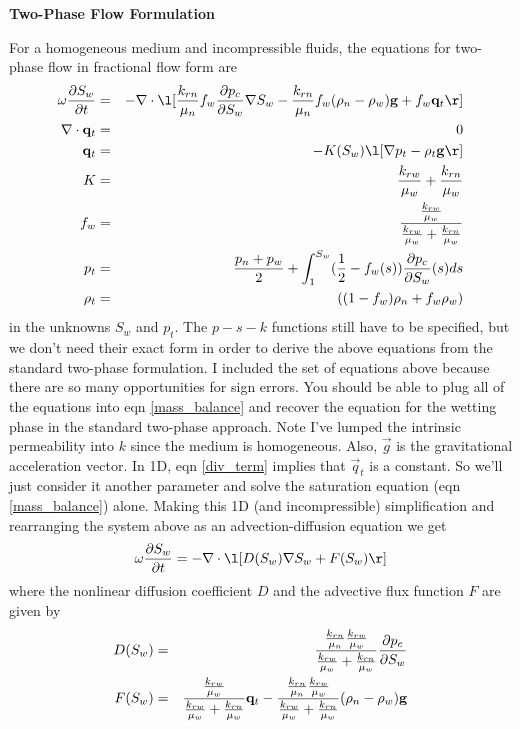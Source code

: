 \documentclass[12pt,dvips]{report}
\begin{document}
\begin{center} \bf Two-Phase Flow Formulation \end{center}

For a homogeneous medium and incompressible fluids, the equations
for two-phase flow in fractional flow form are
\begin{eqnarray}
\omega \pd{S_w}{t}  &=& - \deld \l[ \frac{k_{rn}}{\mu_n} f_w \pd{p_c}{S_w} \grad S_w - \frac{k_{rn}}{\mu_n} f_w (\rho_n - \rho_w) \vec g + f_w \vec q_t \r] \label{mass_balance}\\
\deld  \vec q_t &=& 0 \label{div_term} \\
\vec q_t &=& - K(S_w) \l[ \grad p_t  - \rho_t  \vec g \r] \\ 
K &=& \frac{k_{rw}}{\mu_w}+ \frac{k_{rn}}{\mu_w} \\
f_w &=& \frac{\frac{k_{rw}}{\mu_w}}{\frac{k_{rw}}{\mu_w}+ \frac{k_{rn}}{\mu_w}}\\
p_t &=& \frac{p_n + p_w}{2} + \int_{1}^{S_w}  (\frac{1}{2} - f_w(s)) \pd{p_c}{S_w}(s) ds \\
\rho_t &=& ((1-f_w)\rho_n + f_w \rho_w) 
\end{eqnarray}
in the unknowns $S_w$ and $p_t$.  The $p-s-k$ functions still have to
be specified, but we don't need their exact form in order to derive
the above equations from the standard two-phase formulation. I
included the set of equations above because there are so many
opportunities for sign errors. You should be able to plug all of the
equations into eqn \ref{mass_balance} and recover the equation for
the wetting phase in the standard two-phase approach. Note I've lumped the
intrinsic permeability into $k$ since the medium is homogeneous. Also,
$\vec g$ is the gravitational acceleration vector. In 1D, eqn
\ref{div_term} implies that $\vec q_t$ is a constant. So we'll just
consider it another parameter and solve the saturation equation (eqn \ref{mass_balance}) alone. Making this 1D (and incompressible) simplification and rearranging the
system above as an advection-diffusion equation we get
\begin{equation}
\omega \pd{S_w}{t}  = - \deld \l[ D(S_w) \grad S_w + F(S_w) \r]
\end{equation}
where the nonlinear diffusion coefficient $D$ and the advective flux function $F$ are given by
\begin{eqnarray}
D(S_w) &=& \frac{\frac{k_{rn}}{\mu_n} \frac{k_{rw}}{\mu_w}}{\frac{k_{rw}}{\mu_w}+ \frac{k_{rn}}{\mu_w}} \frac{\partial {p_c}}{\partial {S_w}}  \\
F(S_w) &=&  \frac{\frac{k_{rw}}{\mu_w}}{\frac{k_{rw}}{\mu_w}+ \frac{k_{rn}}{\mu_w}} {\bf q}_t - \frac{\frac{k_{rn}}{\mu_n} \frac{k_{rw}}{\mu_w}}{\frac{k_{rw}}{\mu_w}+ \frac{k_{rn}}{\mu_w}}  (\rho_n - \rho_w) {\bf g}
\end{eqnarray}
\end{document}
